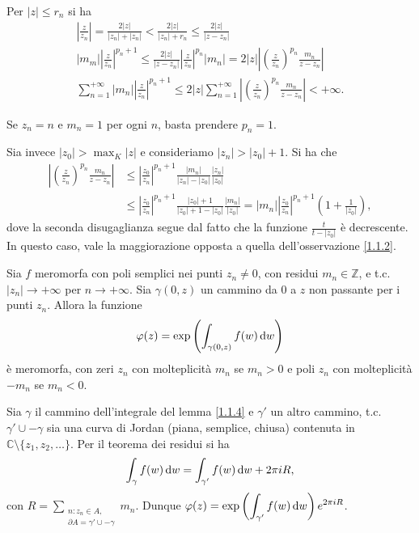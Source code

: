 \begin{oss} \label{1.1.2}
  Per $|z| \le r_n$ si ha
  \begin{gather*}
    \left|\frac{z}{z_n}\right|=\frac{2|z|}{|z_n|+|z_n|}<\frac{2|z|}{|z_n|+r_n} \le \frac{2|z|}{|z-z_n|} \\
    |m_m| \left|\frac{z}{z_n}\right|^{p_n+1} \le \frac{2|z|}{|z-z_n|}\left|\frac{z}{z_n}\right|^{p_n}|m_n|=2|z|\left|\left(\frac{z}{z_n}\right)^{p_n}\frac{m_n}{z-z_n}\right| \\
    \sum_{n=1}^{+\infty} |m_n|\left|\frac{z}{z_n}\right|^{p_n+1} \le 2|z|\sum_{n=1}^{+\infty} \left|\left(\frac{z}{z_n}\right)^{p_n}\frac{m_n}{z-z_n}\right|<+\infty.
  \end{gather*}
\end{oss}

\begin{ex}
  Se $z_n=n$ e $m_n=1$ per ogni $n$, basta prendere $p_n=1$.

  Sia invece $\displaystyle |z_0|>\max_K |z|$ e consideriamo $|z_n|>|z_0|+1$. Si ha che
  \begin{align*}
    \left|\left(\frac{z}{z_n}\right)^{p_n}\frac{m_n}{z-z_n}\right| & \le \left|\frac{z_0}{z_n}\right|^{p_n+1}\frac{|m_n|}{|z_n|-|z_0|}\frac{|z_n|}{|z_0|} \\
    & \le \left|\frac{z_0}{z_n}\right|^{p_n+1}\frac{|z_0|+1}{|z_0|+1-|z_0|}\frac{|m_n|}{|z_0|}=|m_n|\left|\frac{z_0}{z_n}\right|^{p_n+1}\left(1+\frac{1}{|z_0|}\right),
  \end{align*}
  dove la seconda disugaglianza segue dal fatto che la funzione $\frac{t}{t-|z_0|}$ è decrescente. In questo caso, vale la maggiorazione opposta a quella dell'osservazione \ref{1.1.2}.
\end{ex}

\begin{lm} \label{1.1.4}
  Sia $f$ meromorfa con poli semplici nei punti $z_n\not=0$, con residui $m_n \in \mathbb{Z}$, e t.c. $|z_n| \longrightarrow +\infty$ per $n \longrightarrow +\infty$. Sia $\gamma(0,z)$ un cammino da $0$ a $z$ non passante per i punti $z_n$. Allora la funzione
  $$\varphi(z)=\exp\left(\int_{\gamma(0,z)} f(w)\mathop{}\!\mathrm{d} w\right)$$
  è meromorfa, con zeri $z_n$ con molteplicità $m_n$ se $m_n>0$ e poli $z_n$ con molteplicità $-m_n$ se $m_n<0$.
\end{lm}

\begin{oss} \label{1.1.5}
  Sia $\gamma$ il cammino dell'integrale del lemma \ref{1.1.4} e $\gamma'$ un altro cammino, t.c. $\gamma' \cup -\gamma$ sia una curva di Jordan (piana, semplice, chiusa) contenuta in $\mathbb{C}\setminus\{z_1,z_2,\dots\}$. Per il teorema dei residui si ha
  $$\int_{\gamma}f(w)\mathop{}\!\mathrm{d} w=\int_{\gamma'}f(w)\mathop{}\!\mathrm{d} w+2\pi iR,$$
  con $R=\displaystyle\sum_{\substack{n:z_n \in A, \\ \partial A=\gamma'\cup-\gamma}} m_n$. Dunque $\displaystyle\varphi(z)=\exp\left(\int_{\gamma'}f(w)\mathop{}\!\mathrm{d} w\right)e^{2\pi iR}$.
\end{oss}

